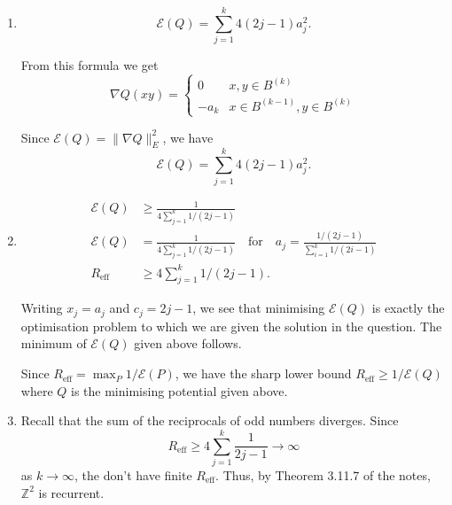 \documentclass[12 pt, letterpaper]{hmcpset}
\begin{document}
\begin{solution}
\begin{enumerate}
		\item
			\[
				\boxed{
					\mathcal{E}(Q) = \sum_{j = 1}^{k} 4(2j - 1) a_{j}^{2}.
				}
			\]

			From this formula we get
			\[
				\nabla Q(xy) = \begin{cases}
					0 & x, y \in B^{(k)} \\
					- a_{k} & x \in B^{(k - 1)}, y \in B^{(k)}
				\end{cases}
			\]

			Since $\mathcal{E}(Q) = \lVert \nabla Q \rVert_{E}^{2}$, we have
			\[
				\mathcal{E}(Q) = \sum_{j = 1}^{k} 4(2j - 1) a_{j}^{2}.
			\]

		\item
			\[
				\boxed{
					\begin{split}
						\mathcal{E}(Q) & \ge \frac{1}{4 \sum_{j = 1}^{k} 1/(2j - 1)} \\
						\mathcal{E}(Q) & = \frac{1}{4 \sum_{j = 1}^{k} 1/(2j - 1)} \quad \text{for} \quad a_{j} = \frac{1/(2j - 1)}{\sum_{i = 1}^{k} 1/(2i - 1)} \\
						R_{\text{eff}} & \ge {4 \sum_{j = 1}^{k} 1/(2j - 1)}.
					\end{split}
				}
			\]

			Writing $x_{j} = a_{j}$ and $c_{j} = 2j - 1$, we see that minimising $\mathcal{E}(Q)$ is exactly the optimisation problem to which we are given the solution in the question. The minimum of $\mathcal{E}(Q)$ given above follows.

			Since $R_{\text{eff}} = \max_{P} {1}/{\mathcal{E}(P)}$, we have the sharp lower bound $R_{\text{eff}} \ge 1 / \mathcal{E}(Q)$ where $Q$ is the minimising potential given above.

		\item Recall that the sum of the reciprocals of odd numbers diverges. Since
			\[
				R_{\text{eff}} \ge 4 \sum_{j = 1}^{k} \frac{1}{2j - 1} \to \infty
			\]
			as $k \to \infty$, the don't have finite $R_{\text{eff}}$. Thus, by Theorem 3.11.7 of the notes, $\mathbb{Z}^{2}$ is recurrent.
	\end{enumerate}
\end{solution}

\pagebreak
\end{document}
